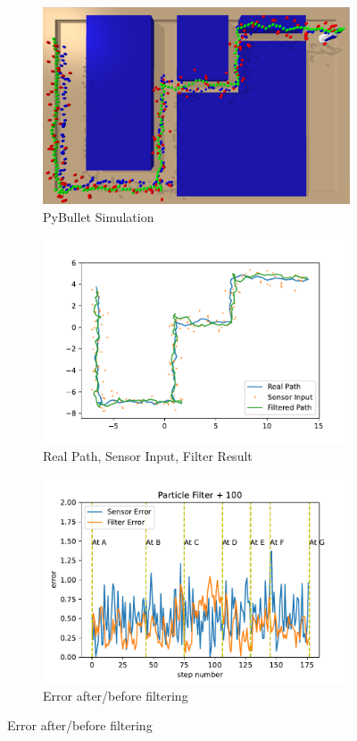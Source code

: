 \documentclass[conference,onecolumn]{IEEEtran}
\begin{document}
\begin{figure}[H]
  \begin{subfigure}[t]{.3\linewidth}
    \centering\includegraphics[width=\linewidth]{Figs/p100.png}
    \caption{PyBullet Simulation}
  \end{subfigure}
  \begin{subfigure}[t]{.3\linewidth}
    \centering\includegraphics[width=\linewidth]{Figs/Particle Filter + 100Path.pdf}
    \caption{Real Path, Sensor Input, Filter Result}
  \end{subfigure}
  \begin{subfigure}[t]{.3\linewidth}
    \centering\includegraphics[width=\linewidth]{Figs/Particle Filter + 100Error.pdf}
    \caption{Error after/before filtering}
  \end{subfigure}


\end{figure}
\end{document}
